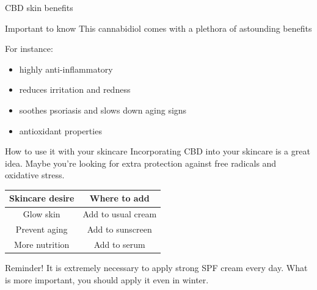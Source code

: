 \documentclass{beamer}
\begin{document}
    \begin{frame}{CBD skin benefits}

\begin{alertblock}{Important to know}
This cannabidiol comes with a plethora of astounding benefits
\end{alertblock}

\begin{block}{For instance:}
\begin{itemize}
 \item<1-> highly \alert{anti-inflammatory}
 \item<1-> reduces irritation and redness
 \item<1-> soothes psoriasis and slows down aging signs
 \item<1-> antioxidant properties
\end{itemize}
\end{block}
    
    \end{frame}

    \begin{frame}{How to use it with your skincare}
Incorporating CBD into your skincare is a great idea. Maybe you’re looking for extra protection against free radicals and oxidative stress. 

\begin{center}
\begin{table}[h!]
\centering
 \begin{tabular}{||c c||} 
 \hline
Skincare desire & Where to add \\ [0.5ex] 
 \hline\hline
 Glow skin & Add to usual cream \\ 
 \hline
 Prevent aging & Add to sunscreen  \\
 \hline
 More nutrition & Add to serum \\ [1ex]
 \hline
 \end{tabular}
\end{table}
\end{center}
\begin{alertblock}{Reminder!}
It is extremely necessary to apply strong SPF cream every day. What is more important, you should apply it even in winter.
\end{alertblock}
        
    \end{frame}

 
\end{document}
